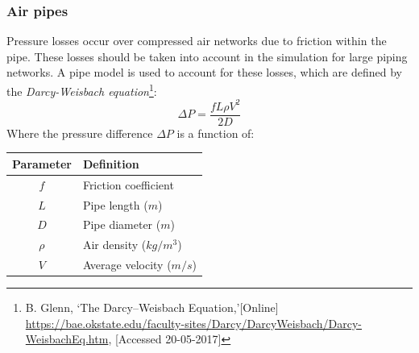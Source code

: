 		\subsubsection{Air pipes}
		Pressure losses occur over compressed air networks due to friction within the pipe. These losses should be taken into account in the simulation for large piping networks. A pipe model is used to account for these losses, which are defined by the \textit{Darcy-Weisbach equation}\footnote{ B. Glenn, \enquote*{The Darcy–Weisbach Equation,}[Online] \url{https://bae.okstate.edu/faculty-sites/Darcy/DarcyWeisbach/Darcy-WeisbachEq.htm}, [Accessed 20-05-2017]}:
		$$\Delta P = \frac{f L \rho V^2}{2 D}$$
		Where the pressure difference $\Delta P $ is a function of:
		\begin{table}[h!]
			\centering
			\begin{tabular}{cl}
				\hline
				Parameter & Definition\\
				\hline
				$f$ & Friction coefficient \\
				$L$ & Pipe length ($m$) \\
				$D$ & Pipe diameter ($m$) \\
				$\rho$ & Air density ($kg/m^3$)\\	
				$V$ & Average velocity ($m/s$) \\	
				\hline
			\end{tabular} 
			\label{table: Darcy-Weisbach}
		\end{table}
		
